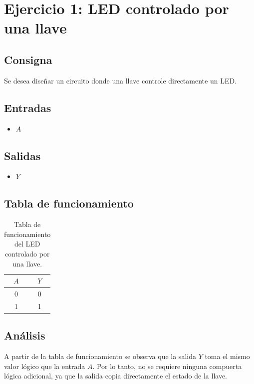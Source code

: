 \documentclass[a4paper,12pt]{article}
\begin{document}
	
	
\section{Ejercicio 1: LED controlado por una llave}

\subsection{Consigna}

Se desea diseñar un circuito donde una llave controle directamente un LED.

\subsection{Entradas}

\begin{itemize}
	\item $A$
\end{itemize}

\subsection{Salidas}

\begin{itemize}
	\item $Y$
\end{itemize}

\subsection{Tabla de funcionamiento}

\begin{table}[h]
	\centering
	\begin{tabular}{|c|c|}
		\hline
		$A$ & $Y$ \\ \hline
		0 & 0 \\ \hline
		1 & 1 \\ \hline
	\end{tabular}
	\caption{Tabla de funcionamiento del LED controlado por una llave.}
	\label{tab:ej1_funcionamiento}
\end{table}

\subsection{Análisis}

A partir de la tabla de funcionamiento se observa que la salida $Y$ toma el mismo valor lógico que la entrada $A$. Por lo tanto, no se requiere ninguna compuerta lógica adicional, ya que la salida copia directamente el estado de la llave.
\end{document}
